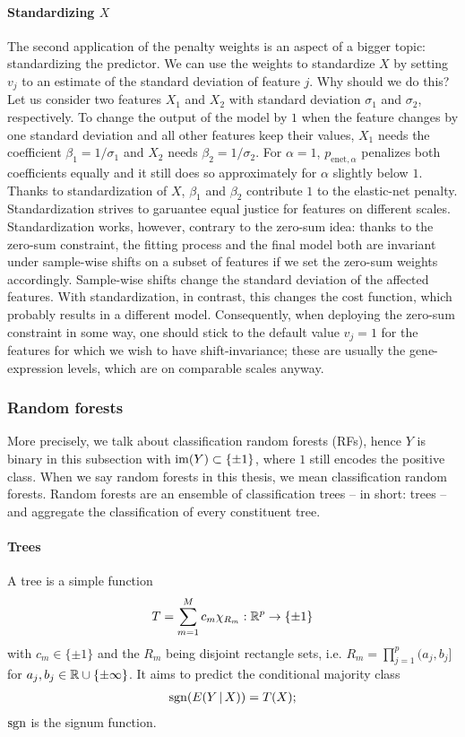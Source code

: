 \paragraph{Standardizing $X$} 
The second application of the penalty weights is an aspect of a bigger topic: standardizing the
predictor. We can use the weights to standardize $X$ by setting $v_j$ to an estimate of the standard 
deviation of feature $j$. Why 
should we do this? Let us consider two features $X_1$ and $X_2$ with standard deviation $\sigma_1$
and $\sigma_2$, respectively. To change the output of the model by $1$ when the feature changes by 
one standard deviation and all other features keep their values, $X_1$ needs the coefficient 
$\beta_1 = 1/\sigma_1$ and $X_2$ needs $\beta_2 = 1/\sigma_2$. For $\alpha = 1$, 
$p_{\text{enet}, \alpha}$ penalizes both coefficients equally and it still does so approximately 
for $\alpha$ slightly below $1$. Thanks to standardization of $X$, $\beta_1$ and $\beta_2$ contribute 
$1$ to the elastic-net penalty. Standardization strives to garuantee equal justice for features 
on different scales. Standardization works, however, contrary to the zero-sum idea: thanks to the 
zero-sum constraint, the fitting process and the final model both are invariant under sample-wise 
shifts on a subset of features if we set the zero-sum weights accordingly. Sample-wise shifts 
change the standard deviation of the affected features. With standardization, in 
contrast, this changes the cost function, which probably results in a different model. 
Consequently, when deploying the zero-sum constraint in some way, one should stick to the default 
value $v_j = 1$ for the features for which we wish to have shift-invariance; these are usually the 
gene-expression levels, which are on comparable scales anyway.

\subsubsection{Random forests}

More precisely, we talk about classification random forests (RFs), hence $Y$ is binary in this subsection 
with $\mathrm{im}(Y) \subset \{ \pm 1 \}$, where $1$ still encodes the positive class. When we say random 
forests in this thesis, we mean classification 
random forests. Random forests are an ensemble of classification trees -- in short: 
trees -- and aggregate the classification of every constituent tree.

\paragraph{Trees}
A tree is a simple function
\begin{align}
    T = \sum_{m=1}^M c_m \chi_{R_m}: \mathbb{R}^p \to \{ \pm 1 \}
\end{align}
with $c_m \in \{\pm 1\}$ and the $R_m$ being disjoint rectangle sets, i.e. $R_m = \prod_{j=1}^p 
(a_j, b_j]$ for $a_j, b_j \in \mathbb{R} \cup \{ \pm \infty \}$. It aims to predict the conditional 
majority class 
\begin{align}\label{eq:rf-major}
    \mathrm{sgn}(E(Y \,|\, X)) = T(X);
\end{align}
$\mathrm{sgn}$ is the signum function.

